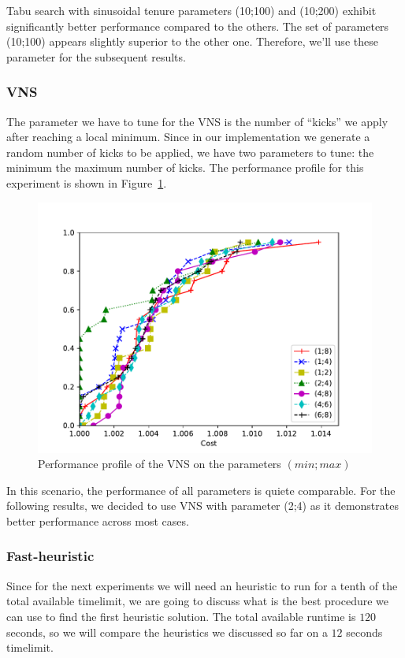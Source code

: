 \documentclass{article}
\begin{document}
Tabu search with sinusoidal tenure parameters (10;100) and (10;200) exhibit significantly better performance compared to the others.
The set of parameters (10;100) appears slightly superior to the other one. Therefore, we'll use these parameter for the
subsequent results.

\clearpage

\subsubsection{VNS}
The parameter we have to tune for the VNS is the number of ``kicks'' we apply
after reaching a local minimum. Since in our implementation we generate a
random number of kicks to be applied, we have two parameters to tune: the
minimum the maximum number of kicks.
The performance profile for this experiment is shown in Figure~\ref{fig:ht_vns}.

\begin{figure}[ht]
        \caption{Performance profile of the VNS on the parameters $\left(min; max\right)$}
        \label{fig:ht_vns}
        \centering
        \includegraphics[width=340pt]{assets/ht_vns.pdf}
\end{figure}

In this scenario, the performance of all parameters is quiete comparable. For the following results, we decided to use
VNS with parameter (2;4) as it demonstrates better performance across most cases.

\clearpage
\subsubsection{Fast-heuristic}
Since for the next experiments we will need an heuristic to run for a tenth of
the total available timelimit, we are going to discuss what is the best
procedure we can use to find the first heuristic solution. The total available
runtime is $120$ seconds, so we will compare the heuristics we discussed so far
on a $12$ seconds timelimit.
\end{document}
